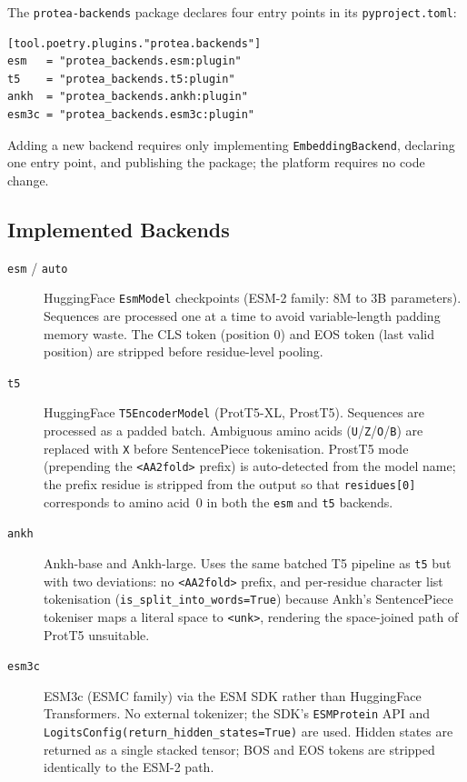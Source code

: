 The \texttt{protea-backends} package declares four entry points in its
\texttt{pyproject.toml}:

\begin{lstlisting}[caption={Backend entry-point declarations (pyproject.toml).}]
[tool.poetry.plugins."protea.backends"]
esm   = "protea_backends.esm:plugin"
t5    = "protea_backends.t5:plugin"
ankh  = "protea_backends.ankh:plugin"
esm3c = "protea_backends.esm3c:plugin"
\end{lstlisting}

Adding a new backend requires only implementing \texttt{EmbeddingBackend},
declaring one entry point, and publishing the package; the platform requires
no code change.

\subsection{Implemented Backends}
\label{subsec:implemented-backends}

\begin{description}
  \item[\texttt{esm} / \texttt{auto}] HuggingFace \texttt{EsmModel}
    checkpoints (ESM-2 family: 8M to 3B parameters). Sequences are processed
    one at a time to avoid variable-length padding memory waste. The CLS token
    (position 0) and EOS token (last valid position) are stripped before
    residue-level pooling.

  \item[\texttt{t5}] HuggingFace \texttt{T5EncoderModel} (ProtT5-XL,
    ProstT5). Sequences are processed as a padded batch. Ambiguous amino acids
    (\texttt{U}/\texttt{Z}/\texttt{O}/\texttt{B}) are replaced with \texttt{X}
    before SentencePiece tokenisation. ProstT5 mode (prepending the
    \texttt{<AA2fold>} prefix) is auto-detected from the model name; the prefix
    residue is stripped from the output so that \texttt{residues[0]}
    corresponds to amino acid~0 in both the \texttt{esm} and \texttt{t5}
    backends.

  \item[\texttt{ankh}] Ankh-base and Ankh-large. Uses the same batched T5
    pipeline as \texttt{t5} but with two deviations: no \texttt{<AA2fold>}
    prefix, and per-residue character list tokenisation
    (\texttt{is\_split\_into\_words=True}) because Ankh's SentencePiece
    tokeniser maps a literal space to \texttt{<unk>}, rendering the
    space-joined path of ProtT5 unsuitable.

  \item[\texttt{esm3c}] ESM3c (ESMC family) via the ESM SDK rather than
    HuggingFace Transformers. No external tokenizer; the SDK's
    \texttt{ESMProtein} API and \texttt{LogitsConfig(return\_hidden\_states=True)}
    are used. Hidden states are returned as a single stacked tensor; BOS and
    EOS tokens are stripped identically to the ESM-2 path.
\end{description}

